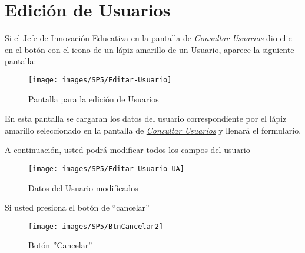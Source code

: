 \begin{itemize}
                \end{itemize}

\newpage

            \section{Edición de Usuarios} 
                Si el Jefe de Innovación Educativa en la pantalla de \hyperlink{consultarUs}{\textit{Consultar Usuarios}} dio clic en el botón con el icono de un lápiz amarillo de un Usuario, aparece la siguiente pantalla:
                
                \begin{figure}[!hbtp]
                    \centering
                    \hypertarget{editarUs}{\texttt{[image: images/SP5/Editar-Usuario]}}
                    \caption{Pantalla para la edición de Usuarios}
                    \label{editarrh}
                \end{figure}
                
                En esta pantalla se cargaran los datos del usuario correspondiente por el lápiz amarillo seleccionado en la pantalla de \hyperlink{consultarUs}{\textit{Consultar Usuarios}} y llenará el formulario.
            
                A continuación, usted podrá modificar todos los campos del usuario
                \begin{figure}[!hbtp]
                    \centering
                    \hypertarget{modif}{\texttt{[image: images/SP5/Editar-Usuario-UA]}}
                    \caption{Datos del Usuario modificados}
                    \label{modif}
                \end{figure}
                
                Si usted presiona el botón de “cancelar”
                
                \begin{figure}[!hbtp]
                    \centering
                    \hypertarget{cancel2}{\texttt{[image: images/SP5/BtnCancelar2]}}
                    \caption{Botón ''Cancelar''}
                    \label{cancel2}
                \end{figure}
                
